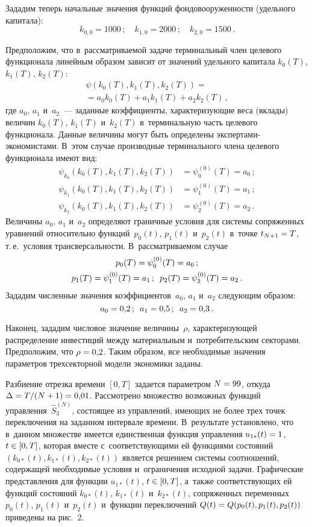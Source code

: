 \begin{multicols}{2}
Зададим теперь начальные значения функций фондовооруженности (удельного капитала):
\begin{equation*} 
k_{0,0}=1000\,; \quad  k_{1,0}=2000\,; \quad k_{2,0}=1500\,.
\end{equation*}

Предположим, что в~рассматриваемой задаче терминальный член целевого функционала линейным образом зависит от значений удельного капитала $k_0(T)$, $k_1(T)$, $k_2(T)$:
\begin{multline*} 
\psi(k_0(T),k_1(T),k_2(T))={}\\
{}=a_0 k_0(T)+ a_1 k_1(T) + a_2 k_2(T)\,,
\end{multline*}
где $a_0$, $a_1$ и~$a_2$~--- заданные коэффициенты, характеризующие веса (вклады) 
величин $k_0(T)$, $k_1(T)$ и~$k_2(T)$ в~терминальную часть целевого функционала. Данные
 величины могут быть определены экс\-пер\-та\-ми-эко\-но\-миста\-ми. 
 В~этом случае производные терминального члена целевого функционала имеют вид:
\begin{align*}
\psi_{k_{0}}(k_0(T),k_1(T),k_2(T))&=\psi^{(0)}_{0}(T)=a_0\,;
\\
\psi_{k_{1}}(k_0(T),k_1(T),k_2(T))&=\psi^{(0)}_{1}(T)=a_1\,;
\\
\psi_{k_{2}}(k_0(T),k_1(T),k_2(T))&=\psi^{(0)}_{2}(T)=a_2\,.
\end{align*}
Величины $a_0$, $a_1$ и~$a_2$ определяют граничные условия для системы 
сопряженных уравнений относительно функций~$p_0(t)$, $p_1(t)$ и~$p_2(t)$ в~точке 
$t_{N+1}\hm=T$, 
т.\,е.\ условия трансверсальности. В~рассматрива\-емом случае
\begin{gather*}
p_0(T)=\psi^{(0)}_{0}(T)=a_0\,; \\ 
p_1(T)=\psi^{(0)}_{1}(T)=a_1\,; \enskip p_2(T)=\psi^{(0)}_{2}(T)=a_2\,.
\end{gather*}
Зададим численные значения коэффициентов~$a_0$, $a_1$ и~$a_2$ следующим образом:
$$
a_0=0{,}2\,; \enskip a_1=0{,}5\,; \enskip a_2=0{,}3\,.
$$

Наконец, зададим числовое значение величины~$\rho$, характеризующей 
распределение инвестиций между материальным и~потребительским секторами. 
Предположим, что $\rho\hm=0{,}2$.
Таким образом, все необходимые значения параметров трехсекторной модели экономики 
заданы.

Разбиение отрезка времени $[0,T]$ задается параметром $N\hm=99$, откуда 
$\Delta\hm={T}/({N+1})\hm=0{,}01$. Рассмотрено множество возможных функций 
управ\-ле\-ния~$\hat S^{(N)}_3$, состоящее из управлений, имеющих не более трех точек 
переключения на заданном интервале времени. В~результате установлено, что в~данном 
множестве имеется единственная функция управления $u_{1*}(t)\hm=1$, $t \hm\in [0,T]$, 
которая вместе с~соответствующими ей функциями состояний 
$(k_{0*}(t),k_{1*}(t),k_{2*}(t))$ является решением системы соотношений, 
содержащей необходимые условия и~ограничения исходной задачи. Графические 
представления для функции $u_{1*}(t)$, $t \hm\in [0,T]$, а~также соответствующих 
ей функций состояний $k_{0*}(t)$, $k_{1*}(t)$  и~$k_{2*}(t)$, сопряженных 
переменных $p_0(t)$, $p_1(t)$ и~$p_2(t)$ и~функции переключений 
$Q(t)\hm=Q(p_0(t),p_1(t),p_2(t))$ приведены на рис.~2.





\end{multicols}

